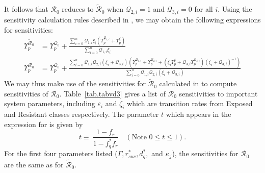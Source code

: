 \documentclass[a4paper]{article}
\newcommand{\kVar }{\kappa }
\newcommand{\varpiVar}{r_{suc}}
\newcommand{\hatmuVar}{d_q}
\begin{document}
It follows that $\mathcal{R}_0$ reduces to $\widetilde{\mathcal{R}}_0$ when $\mathcal{Q}_{2,i}=1$ and $\mathcal{Q}_{3,i}=0$ for all $i$. 
Using the sensitivity calculation rules described in \cite{jck-19}, we may obtain the following expressions for sensitivities:
\begin{equation}
 \begin{aligned}
\Upsilon_p^{\widetilde{\mathcal{R}}_0} &=  \Upsilon_p^{\mathcal{Q}_0} + \frac{\sum_{i=0}^n \mathcal{Q}_{1,i} \xi_i \left(\Upsilon_p^{\mathcal{Q}_{1,i}} + \Upsilon_p^{\xi} \right) }{\sum_{i=0}^n \mathcal{Q}_{1,i} \xi_i} \\
\Upsilon_p^{\mathcal{R}_0} &=  \Upsilon_p^{\mathcal{Q}_0} + \frac{\sum_{i=0}^n \mathcal{Q}_{1,i}\mathcal{Q}_{2,i} \left(\xi_i + \mathcal{Q}_{3,i} \right)  \left(\Upsilon_p^{\mathcal{Q}_{1,i}} + \Upsilon_p^{\mathcal{Q}_{2,i}} +  \left(\xi_i \Upsilon_p^{\xi} + \mathcal{Q}_{3,i}\Upsilon_p^{\mathcal{Q}_{3,i}}\right)\left(\xi_i + \mathcal{Q}_{3,i}\right)^{-1} \right) }{\sum_{i=0}^n \mathcal{Q}_{1,i} \mathcal{Q}_{2,i} \left(\xi_i + \mathcal{Q}_{3,i} \right) } 
\end{aligned}
\end{equation} 
We may thus make use of the sensitivities for $\widetilde{\mathcal{R}}_0$ calculated in \cite{jck-19} to compute sensitivities of $\mathcal{R}_0$. Table~\ref{tab.tabvd3} gives a list of $\mathcal{R}_0$ sensitivities to important system parameters, including  $ \varepsilon_i $ and $\zeta_i $ which are transition rates from Exposed and Resistant classes respectively.
 The parameter $t$ which appears in the expression for is given by
\begin{equation}
t \equiv \ \frac{1-f_r}{1-f_q^*f_r} \quad (\text{Note  } 0 \leqslant t \leqslant 1).
\end{equation}
For the first four parameters listed  ($\Gamma, \varpiVar^*,\hatmuVar^*, $ and $\kVar_j$), the sensitivities for $\mathcal{R}_0$  are the same as for $\widetilde{\mathcal{R}}_0$. 
\end{document}
